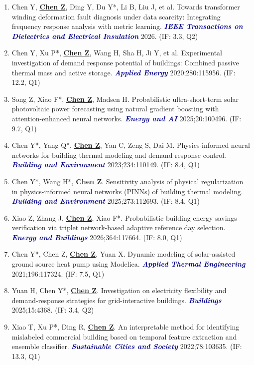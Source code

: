 \documentclass[11pt,a4paper]{article}
\newcommand{\me}[1]{\underline{\textbf{#1}}}
\newcommand{\journal}[1]{\textcolor{darkblue}{\textbf{\textit{#1}}}}
\begin{document}
\begin{enumerate}[itemsep=1pt]
\item Chen Y, \me{Chen Z}, Ding Y, Du Y*, Li B, Liu J, et al. Towards transformer winding deformation fault diagnosis under data scarcity: Integrating frequency response analysis with metric learning. \journal{IEEE Transactions on Dielectrics and Electrical Insulation} 2026. (IF: 3.3, Q2)

\item Chen Y, Xu P*, \me{Chen Z}, Wang H, Sha H, Ji Y, et al. Experimental investigation of demand response potential of buildings: Combined passive thermal mass and active storage. \journal{Applied Energy} 2020;280:115956. (IF: 12.2, Q1)

\item Song Z, Xiao F*, \me{Chen Z}, Madsen H. Probabilistic ultra-short-term solar photovoltaic power forecasting using natural gradient boosting with attention-enhanced neural networks. \journal{Energy and AI} 2025;20:100496. (IF: 9.7, Q1)

\item Chen Y*, Yang Q*, \me{Chen Z}, Yan C, Zeng S, Dai M. Physics-informed neural networks for building thermal modeling and demand response control. \journal{Building and Environment} 2023;234:110149. (IF: 8.4, Q1)

\item Chen Y*, Wang H*, \me{Chen Z}. Sensitivity analysis of physical regularization in physics-informed neural networks (PINNs) of building thermal modeling. \journal{Building and Environment} 2025;273:112693. (IF: 8.4, Q1)

\item Xiao Z, Zhang J, \me{Chen Z}, Xiao F*. Probabilistic building energy savings verification via triplet network-based adaptive reference day selection. \journal{Energy and Buildings} 2026;364:117664. (IF: 8.0, Q1)

\item Chen Y*, Chen Z, \me{Chen Z}, Yuan X. Dynamic modeling of solar-assisted ground source heat pump using Modelica. \journal{Applied Thermal Engineering} 2021;196:117324. (IF: 7.5, Q1)

\item Yuan H, Chen Y*, \me{Chen Z}. Investigation on electricity flexibility and demand-response strategies for grid-interactive buildings. \journal{Buildings} 2025;15:4368. (IF: 3.4, Q2)

\item Xiao T, Xu P*, Ding R, \me{Chen Z}. An interpretable method for identifying mislabeled commercial building based on temporal feature extraction and ensemble classifier. \journal{Sustainable Cities and Society} 2022;78:103635. (IF: 13.3, Q1)


\end{enumerate}
\end{document}
